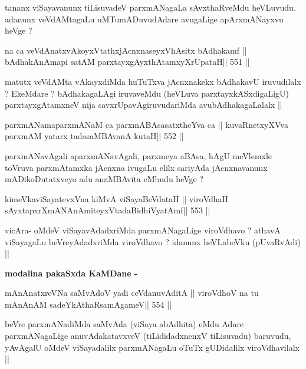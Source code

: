 \begin{artha}
tananx viSayavanunx tiLisuvadeV parxmANagaLa sAvxthaRveMdu heVLuvudu.
adanunx veVdAMtagaLu uMTumADuvudAdare avugaLige apArxmANayxvu heVge ?
\end{artha}

\begin{shl}
na ca veVdAnatxvAkoyxVtathxjAcnxnaseyxVhAsitx bAdhakamf ||
bAdhakAnAmapi satAM parxtayxgAyxthAtamxyXrUpataH\hfill || 551 ||
\end{shl}

\begin{artha}
matutx veVdAMta vAkayxdiMda huTuTxva jAcnxnakekx bAdhakavU iruvudilalx
? EkeMdare ? bAdhakagaLAgi iruvaveMdu (heVLuva parxtayxkASxdigaLigU)
parxtayxgAtamxneV nija savxrUpavAgiruvudariMda avubAdhakagaLalalx ||
\end{artha}

\begin{shl}
parxmANamaparxmANaM ca parxmABAsasatxtheYva ca ||
kuvaRnetxyXVva parxmAM yatarx tadasaMBAvanA kutaH\hfill || 552 ||
\end{shl}

\begin{artha}
parxmANavAgali aparxmANavAgali, parxmeya aBAsa, hAgU meVlemxle
toVruva parxmAtamxka jAcnxna ivugaLu elilx sariyAda jAcnxnavanunx
mADikoDutatxveyo adu anaMBAvita eMbudu heVge ? 
\end{artha}

\begin{shl}
kimeVkaviSayatevxVna kiMvA viSayaBeVdataH ||
viroVdhaH sAyxtapxrXmANAnAmiteyxVtadaBidhiVyatAmf\hfill || 553 ||
\end{shl}

\begin{artha}
vicAra- oMdeV viSayavAdadxriMda parxmANagaLige viroVdhavo ? athavA
viSayagaLu beVreyAdadxriMda viroVdhavo ? idanunx heVLabeVku
(pUvaRvAdi) ||
\end{artha}

\medskip
\centerline{\textbf{modalina pakaSxda KaMDane -}}

\begin{shl}
mAnAnatxreVNa saMvAdoV yadi ceVdanuvAditA ||
viroVdhoV na tu mAnAnAM sadeYkAthaRsamAgameV\hfill || 554 ||
\end{shl}

\begin{artha}
beVre parxmANadiMda saMvAda (viSaya abAdhita) eMdu Adare
parxmANagaLige anuvAdakatavxveV (tiLididadxnenxV tiLisuvadu) baruvudu,
yAvAgalU oMdeV viSayadalilx parxmANagaLu oTuTx gUDidalilx
viroVdhavilalx ||
\end{artha}

